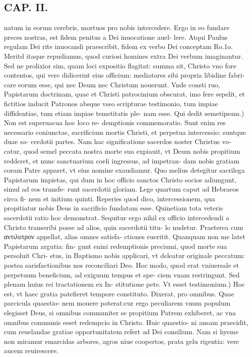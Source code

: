 \documentclass{article}
\begin{document}
\begin{pages}
\section*{CAP. II. }
\marginpar{[ p.23 ]}\pstart natum in eorum cerebris, mortuos pro nobis intercedere. Ergo in eo fundare preces nostras, est fidem penitus a Dei inuocatione auel- lere. Atqui Paulus regulam Dei rite inuocandi praescribit, fidem ex verbo Dei conceptam Ro.1o. Meritd itaque repudiamus, quod curiosi homines extra Dei verbum imaginantur. Sed ne prolixior sim, quam loci expositio flagitat: summa sit, Christo vno fore contentos, qui vere didicerint eius officium: mediatores sibi propria libidine fabri- care eorum esse, qui nec Deum nec Christum nouerunt. Vnde consti ruo, Papistarum doctrinam, quae et Christi patrocinium obscurat, imo fere sepelit, et fictitios inducit Patronos absque vsso scripturae testimonio, tum impiae diffidentiae, tum etiam impiae temetitatis ple- nam esse.  \pend\pstart Qui dedit semetipsum.) Non est superuacua hoc loco re- demptionis commemoratio. Sunt enim res necessario coniunctae, sacrificium mortis Christi, et perpetua intercessio: suntque duae sa- cerdotii partes. Nam hac significatione sacerdos noster Christus vo- catur, quod semel peccata nostra morte sua expiauit, vt Deum nobis propitium redderet, et nunc sanctuarium coeli ingressus, ad impetran- dam nobis gratiam coram Patre apparet, vt eius nomine exaudiamur. Quo melius detegitur sacrilega Papistarum impietas, qui dum in hoc officio sanctos Christo socios adiungunt, simul ad eos transfe- runt sacerdotii gloriam. Lege quartum caput ad Hebraeos circa fi- nem et initium quinti. Reperies quod dico, intercessionem, qua propitiatur nobis Deus in sacrificio fundatam esse. Quinetiam tota veteris sacerdotii ratio hoc demonstrat. Sequitur ergo nihil ex officio intercedendi a Christo transeribi posse ad alios, quin sacerdotii titu- lo nudetur. Praeterea cum αντιλυτρον appellat, alias omnes satisfa- ctiones eueritit. Quanquam non me latet Papistarum argutia: fin- gunt enini redemptionis preciumi, quod morte sua persoluit Chri- stus, in Baptismo nobis applicari, vt deleatur originale peccatum: postea sarisfactionibus nos reconciliari Deo. Hoc modo, quod erat vniuersale et perpetuum beneficium, ad exiguum tempus et spe- ciem vnam restringunt. Sed plenam huius rei tractationem ex In- stitutione pete.  \pend\pstart Vt esset testimonium.) Hoc est, vt haec gratia patefieret tempore constituto. Dixerat, pro omnibus. Quae parcicula quaestio- nem mouere poterat:cur ergo peculiarem vnum populum elegisset Deus, si omnibus communiter se propitium Patrem exhiberet, ac vna omnibus communis esset redempcio in Christo. Huic quaestio- ni ansam praecidit, cum reuelandae gratiae opportunitatem refert ad Dei consilium. Nam si hyeme non miramur emarcidas arbores, agros niue coopertos, prata gelu rigentia: vere aucem reuirescere.  \pend

\end{pages}
\end{document}
